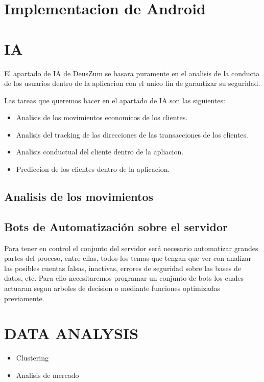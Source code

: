 \documentclass{article}
\theoremstyle{definition}
\begin{document}
\section{Implementacion de Android}




\section{IA}

El apartado de IA de DeusZum se basara puramente en el analisis de la conducta de los usuarios dentro de la aplicacion con el unico fin de garantizar su seguridad.

Las tareas que queremos hacer en el apartado de IA son las siguientes:

\begin{itemize}
    \item Analisis de los movimientos economicos de los clientes.
    \item Analisis del tracking de las direcciones de las transacciones de los clientes.
    \item Analisis conductual del cliente dentro de la apliacion.
    \item Prediccion de los clientes dentro de la aplicacion.
\end{itemize}


\subsection{Analisis de los movimientos}

\subsection{Bots de Automatización sobre el servidor}

Para tener en control el conjunto del servidor será necesario automatizar grandes partes del proceso, entre ellas, todos los temas que tengan que ver con analizar las posibles cuentas falsas, inactivas, errores de seguridad sobre las bases de datos, etc. Para ello necesitaremos programar un conjunto de bots los cuales actuaran segun arboles de decision o mediante funciones optimizadas previamente.

\section{DATA ANALYSIS}

\begin{itemize}
    \item Clustering
    \item Analisis de mercado
\end{itemize}
\end{document}
